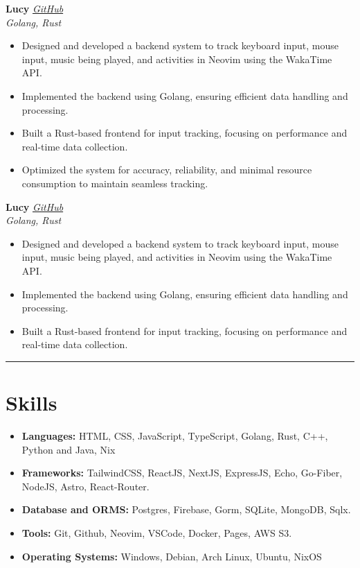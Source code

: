 \documentclass[a4paper,10pt]{article}
\begin{document}
\textbf{Lucy} \hfill \textit{\href{http://github.com/quantinium03/lucy}{GitHub}} \\
\textit{Golang, Rust} \\
\vspace{-15pt}
\begin{itemize}[itemsep=0pt, parsep=0pt]
    \item Designed and developed a backend system to track keyboard input, mouse input, music being played, and activities in Neovim using the WakaTime API.  
    \item Implemented the backend using Golang, ensuring efficient data handling and processing.  
    \item Built a Rust-based frontend for input tracking, focusing on performance and real-time data collection.  
    \item Optimized the system for accuracy, reliability, and minimal resource consumption to maintain seamless tracking.  
\end{itemize}

\textbf{Lucy} \hfill \textit{\href{http://github.com/quantinium03/lucy}{GitHub}} \\
\textit{Golang, Rust} \\
\vspace{-15pt}
\begin{itemize}[itemsep=0pt, parsep=0pt]
    \item Designed and developed a backend system to track keyboard input, mouse input, music being played, and activities in Neovim using the WakaTime API.  
    \item Implemented the backend using Golang, ensuring efficient data handling and processing.  
    \item Built a Rust-based frontend for input tracking, focusing on performance and real-time data collection.  
\end{itemize}

\vspace{5pt}
\hrule
\vspace{5pt}

\section*{Skills}
\begin{itemize}[itemsep=0pt, parsep=0pt]
    \item \textbf{Languages:} HTML, CSS, JavaScript, TypeScript, Golang, Rust, C++, Python and Java, Nix
    \item \textbf{Frameworks:} TailwindCSS, ReactJS, NextJS, ExpressJS, Echo, Go-Fiber, NodeJS, Astro, React-Router.
    \item \textbf{Database and ORMS:} Postgres, Firebase, Gorm, SQLite, MongoDB, Sqlx.
    \item \textbf{Tools:} Git, Github, Neovim, VSCode, Docker, Pages, AWS S3.
    \item \textbf{Operating Systems:} Windows, Debian, Arch Linux, Ubuntu, NixOS
\end{itemize}
\vspace{5pt}
\end{document}
